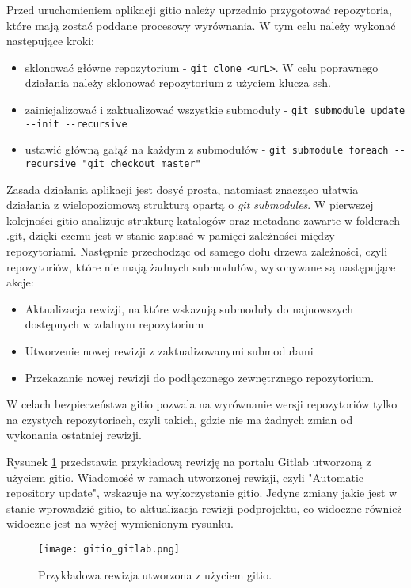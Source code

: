 Przed uruchomieniem aplikacji gitio należy uprzednio przygotować repozytoria, które mają zostać poddane procesowy wyrównania. W tym celu należy wykonać następujące kroki:
\begin{itemize}
    \item sklonować główne repozytorium - \lstinline{git clone <urL>}. W celu poprawnego działania należy sklonować repozytorium z użyciem klucza ssh.
    \item zainicjalizować i zaktualizować wszystkie submoduły - \lstinline{git submodule update --init --recursive}
    \item ustawić główną gałąź na każdym z submodułów - \lstinline{git submodule foreach --recursive "git checkout master"}
\end{itemize}
Zasada działania aplikacji jest dosyć prosta, natomiast znacząco ułatwia działania z wielopoziomową strukturą opartą o \emph{git submodules}. W pierwszej kolejności gitio analizuje strukturę katalogów oraz metadane zawarte w folderach .git, dzięki czemu jest w stanie zapisać w pamięci zależności między repozytoriami. Następnie przechodząc od samego dołu drzewa zależności, czyli repozytoriów, które nie mają żadnych submodułów, wykonywane są następujące akcje:
\begin{itemize}
    \item Aktualizacja rewizji, na które wskazują submoduły do najnowszych dostępnych w zdalnym repozytorium
    \item Utworzenie nowej rewizji z zaktualizowanymi submodułami
    \item Przekazanie nowej rewizji do podłączonego zewnętrznego repozytorium.
\end{itemize}
W celach bezpieczeństwa gitio pozwala na wyrównanie wersji repozytoriów tylko na czystych repozytoriach, czyli takich, gdzie nie ma żadnych zmian od wykonania ostatniej rewizji.

Rysunek \ref{fig:gitlab_gitio} przedstawia przykładową rewizję na portalu Gitlab utworzoną z użyciem gitio. Wiadomość w ramach utworzonej rewizji, czyli "Automatic repository update", wskazuje na wykorzystanie gitio. Jedyne zmiany jakie jest w stanie wprowadzić gitio, to aktualizacja rewizji podprojektu, co widoczne również widoczne jest na wyżej wymienionym rysunku.

\begin{figure}[H]
    \centering
    \texttt{[image: gitio\_gitlab.png]}
    \caption{Przykładowa rewizja utworzona z użyciem gitio.}
    \label{fig:gitlab_gitio}
\end{figure}


